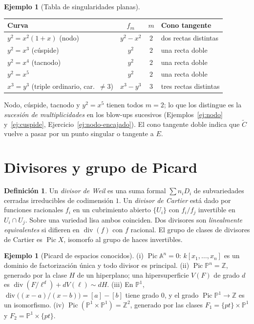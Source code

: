 \documentclass[11pt,a4paper,oneside]{book}
\newcommand{\Pic}{\operatorname{Pic}}
\newcommand{\A}{\mathbb{A}}
\newcommand{\PP}{\mathbb{P}}
\newcommand{\ZZ}{\mathbb{Z}}
\theoremstyle{plain}
\theoremstyle{definition}
\newtheorem{definicion}[teorema]{Definición}
\newtheorem{ejemplo}[teorema]{Ejemplo}
\theoremstyle{remark}
\begin{document}
\begin{ejemplo}[Tabla de singularidades planas]
\begin{center}
\begin{tabular}{@{}lccl@{}}
\toprule
Curva & $f_m$ & $m$ & Cono tangente \\
\midrule
$y^2=x^2(1+x)$ (nodo) & $y^2-x^2$ & $2$ & dos rectas distintas \\
$y^2=x^3$ (cúspide) & $y^2$ & $2$ & una recta doble \\
$y^2=x^4$ (tacnodo) & $y^2$ & $2$ & una recta doble \\
$y^2=x^5$ & $y^2$ & $2$ & una recta doble \\
$x^3=y^3$ (triple ordinario, car.\ $\ne3$) & $x^3-y^3$ & $3$ & tres rectas distintas \\
\bottomrule
\end{tabular}
\end{center}
Nodo, cúspide, tacnodo y $y^2=x^5$ tienen todos $m=2$; lo que los distingue es la \emph{sucesión de multiplicidades} en los blow-ups sucesivos (Ejemplos~\ref{ej:nodo} y~\ref{ej:cuspide}, Ejercicio~\ref{ej:nodo-encajado}). El cono tangente doble indica que $\tilde C$ vuelve a pasar por un punto singular o tangente a $E$.
\end{ejemplo}

\section{Divisores y grupo de Picard}

\begin{definicion}
Un \emph{divisor de Weil} es una suma formal $\sum n_iD_i$ de subvariedades cerradas irreducibles de codimensión $1$. Un \emph{divisor de Cartier} está dado por funciones racionales $f_i$ en un cubrimiento abierto $\{U_i\}$ con $f_i/f_j$ invertible en $U_i\cap U_j$. Sobre una variedad lisa ambos coinciden. Dos divisores son \emph{linealmente equivalentes} si difieren en $\operatorname{div}(f)$ con $f$ racional. El grupo de clases de divisores de Cartier es $\Pic X$, isomorfo al grupo de haces invertibles.
\end{definicion}

\begin{ejemplo}[Picard de espacios conocidos]\label{ej:picard}
(i) $\Pic\A^n=0$: $k[x_1,\dots,x_n]$ es un dominio de factorización única y todo divisor es principal. (ii) $\Pic\PP^n=\ZZ$, generado por la clase $H$ de un hiperplano; una hipersuperficie $V(F)$ de grado $d$ es $\operatorname{div}(F/\ell^d)+dV(\ell)\sim dH$. (iii) En $\PP^1$, $\operatorname{div}\big((x-a)/(x-b)\big)=[a]-[b]$ tiene grado $0$, y el grado $\Pic\PP^1\to\ZZ$ es un isomorfismo. (iv) $\Pic(\PP^1\times\PP^1)=\ZZ^2$, generado por las clases $F_1=\{pt\}\times\PP^1$ y $F_2=\PP^1\times\{pt\}$.
\end{ejemplo}
\end{document}
